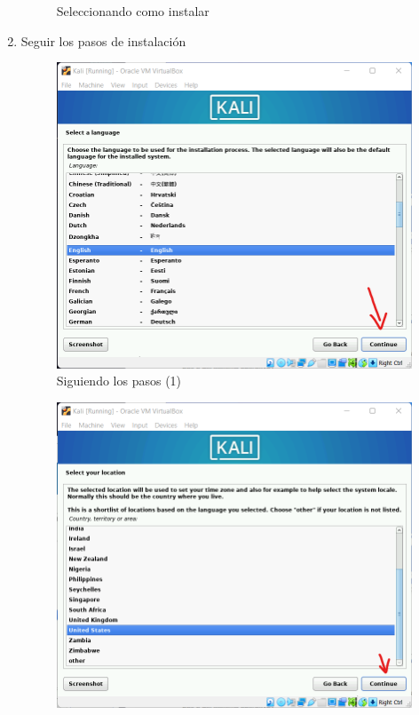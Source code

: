 \documentclass[stu, 12pt, letterpaper, donotrepeattitle, floatsintext, natbib, helv]{apa7}
\begin{document}
\begin{enumerate}
\begin{figure} [H]
        \caption{Seleccionando como instalar}
        \label{fig:GRUB}
    \end{figure}
    \item Seguir los pasos de instalación
    \begin{figure} [H]
        \includegraphics[width = 1\textwidth]{Installation1.png}
        \caption{Siguiendo los pasos (1)}
        \label{fig:Inst1}
    \end{figure}
    \begin{figure} [H]
        \includegraphics[width = 1\textwidth]{Installation2.png}

\end{figure}
\end{enumerate}
\end{document}
